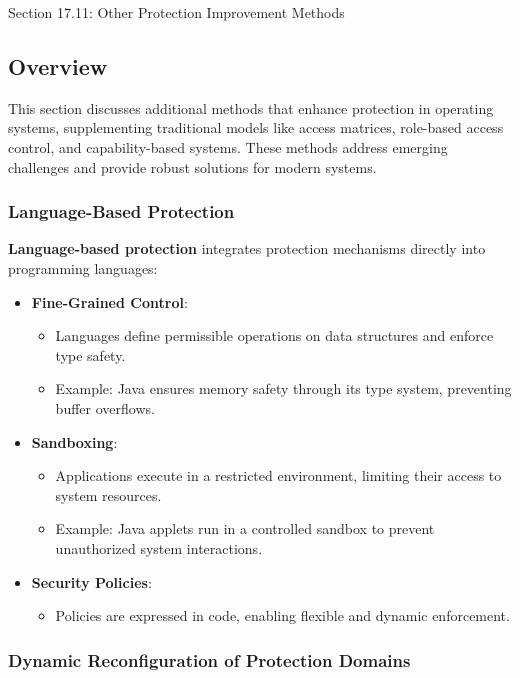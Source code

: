 \begin{notes}{Section 17.11: Other Protection Improvement Methods}
    \subsection*{Overview}

    This section discusses additional methods that enhance protection in operating systems, supplementing traditional models like access matrices, role-based access control, and capability-based 
    systems. These methods address emerging challenges and provide robust solutions for modern systems.
    
    \subsubsection*{Language-Based Protection}
    
    \textbf{Language-based protection} integrates protection mechanisms directly into programming languages:
    \begin{itemize}
        \item \textbf{Fine-Grained Control}:
        \begin{itemize}
            \item Languages define permissible operations on data structures and enforce type safety.
            \item Example: Java ensures memory safety through its type system, preventing buffer overflows.
        \end{itemize}
        \item \textbf{Sandboxing}:
        \begin{itemize}
            \item Applications execute in a restricted environment, limiting their access to system resources.
            \item Example: Java applets run in a controlled sandbox to prevent unauthorized system interactions.
        \end{itemize}
        \item \textbf{Security Policies}:
        \begin{itemize}
            \item Policies are expressed in code, enabling flexible and dynamic enforcement.
        \end{itemize}
    \end{itemize}
    
    \subsubsection*{Dynamic Reconfiguration of Protection Domains}
    

\end{notes}
